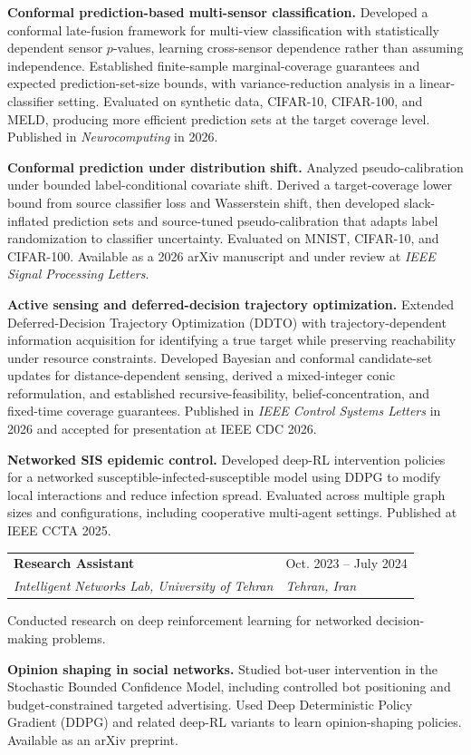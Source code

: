 \documentclass[letterpaper,10pt]{article}
\makeatletter
\newcommand{\datedentry}[4]{%
  \Needspace{3\baselineskip}%
  \noindent\begin{tabularx}{\linewidth}{@{}X >{\raggedleft\arraybackslash}p{1.55in}@{}}
    \textbf{#1} & #2\\[-1pt]
    \textit{#3} & \textit{#4}
  \end{tabularx}\par\vspace{3pt}%
}
\newcommand{\researchtopic}[2]{%
  \Needspace{8\baselineskip}%
  \par\vspace{3pt}\noindent\textbf{#1} #2\par
}
\makeatother
\begin{document}
\researchtopic{Conformal prediction-based multi-sensor classification.}{Developed a conformal late-fusion framework for multi-view classification with statistically dependent sensor $p$-values, learning cross-sensor dependence rather than assuming independence. Established finite-sample marginal-coverage guarantees and expected prediction-set-size bounds, with variance-reduction analysis in a linear-classifier setting. Evaluated on synthetic data, CIFAR-10, CIFAR-100, and MELD, producing more efficient prediction sets at the target coverage level. Published in \textit{Neurocomputing} in 2026.}

\researchtopic{Conformal prediction under distribution shift.}{Analyzed pseudo-calibration under bounded label-conditional covariate shift. Derived a target-coverage lower bound from source classifier loss and Wasserstein shift, then developed slack-inflated prediction sets and source-tuned pseudo-calibration that adapts label randomization to classifier uncertainty. Evaluated on MNIST, CIFAR-10, and CIFAR-100. Available as a 2026 arXiv manuscript and under review at \textit{IEEE Signal Processing Letters}.}

\researchtopic{Active sensing and deferred-decision trajectory optimization.}{Extended Deferred-Decision Trajectory Optimization (DDTO) with trajectory-dependent information acquisition for identifying a true target while preserving reachability under resource constraints. Developed Bayesian and conformal candidate-set updates for distance-dependent sensing, derived a mixed-integer conic reformulation, and established recursive-feasibility, belief-concentration, and fixed-time coverage guarantees. Published in \textit{IEEE Control Systems Letters} in 2026 and accepted for presentation at IEEE CDC 2026.}

\researchtopic{Networked SIS epidemic control.}{Developed deep-RL intervention policies for a networked susceptible-infected-susceptible model using DDPG to modify local interactions and reduce infection spread. Evaluated across multiple graph sizes and configurations, including cooperative multi-agent settings. Published at IEEE CCTA 2025.}

\vspace{15pt}

\datedentry{Research Assistant}{Oct. 2023 -- July 2024}{Intelligent Networks Lab, University of Tehran}{Tehran, Iran}
Conducted research on deep reinforcement learning for networked decision-making problems.

\researchtopic{Opinion shaping in social networks.}{Studied bot-user intervention in the Stochastic Bounded Confidence Model, including controlled bot positioning and budget-constrained targeted advertising. Used Deep Deterministic Policy Gradient (DDPG) and related deep-RL variants to learn opinion-shaping policies. Available as an arXiv preprint.}
\end{document}
